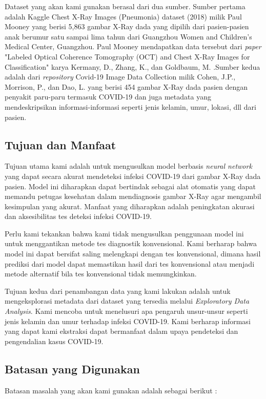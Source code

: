 \documentclass{article}
\begin{document}
	   Dataset yang akan kami gunakan berasal dari dua sumber. Sumber pertama adalah  Kaggle Chest X-Ray Images (Pneumonia) dataset (2018) milik Paul Mooney \cite{mooney} yang berisi 5,863 gambar X-Ray dada yang dipilih dari pasien-pasien anak berumur satu sampai lima tahun dari Guangzhou Women and Children’s Medical Center, Guangzhou. Paul Mooney mendapatkan data tersebut dari \textit{paper} "Labeled Optical Coherence Tomography (OCT) and Chest X-Ray Images for Classification" karya Kermany, D., Zhang, K., dan Goldbaum, M. \cite{kermany}.Sumber kedua adalah dari \textit{repository} Covid-19 Image Data Collection milik Cohen, J.P., Morrison, P., dan Dao, L. \cite{cohen} yang berisi 454 gambar X-Ray dada pasien dengan penyakit paru-paru termasuk COVID-19 dan juga metadata yang mendeskripsikan informasi-informasi seperti jenis kelamin, umur, lokasi, dll dari pasien. 
	   
	   \subsection{Tujuan dan Manfaat}
	   Tujuan utama kami adalah untuk mengusulkan model berbasis \textit{neural network} yang dapat secara akurat mendeteksi infeksi COVID-19 dari gambar X-Ray dada pasien. Model ini diharapkan dapat bertindak sebagai alat otomatis yang dapat memandu petugas kesehatan dalam mendiagnosis gambar X-Ray agar mengambil kesimpulan yang akurat. Manfaat yang diharapkan adalah peningkatan akurasi dan aksesibilitas tes deteksi infeksi COVID-19. 
	   \par
	   Perlu kami tekankan bahwa kami tidak mengusulkan penggunaan model ini untuk menggantikan metode tes diagnostik konvensional. Kami berharap bahwa model ini dapat bersifat saling melengkapi dengan tes konvensional, dimana hasil prediksi dari model dapat memastikan hasil dari tes konvensional atau menjadi metode alternatif bila tes konvensional tidak memungkinkan. 
	   \par
	   Tujuan kedua dari penambangan data yang kami lakukan adalah untuk mengeksplorasi metadata dari dataset yang tersedia melalui \textit{Exploratory Data Analysis}. Kami mencoba untuk menelusuri apa pengaruh unsur-unsur seperti jenis kelamin dan umur terhadap infeksi COVID-19. Kami berharap informasi yang dapat kami ekstraksi dapat bermanfaat dalam upaya pendeteksi dan pengendalian kasus COVID-19.
	   
	   \subsection{Batasan yang Digunakan}
	   Batasan masalah yang akan kami gunakan adalah sebagai berikut :
	   
\end{document}
